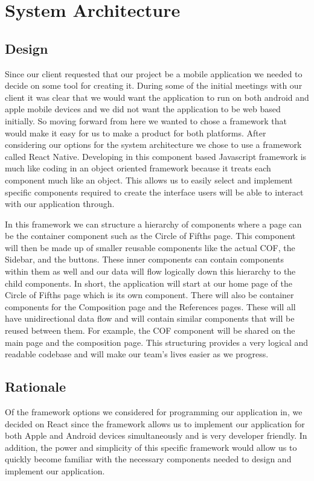 \documentclass[onecolumn, draftclsnofoot,10pt, compsoc]{IEEEtran}
\begin{document}
\section{System Architecture}
\subsection{Design}
Since our client requested that our project be a mobile application we needed to decide on some tool for creating it.
During some of the initial meetings with our client it was clear that we would want the application to run on both android and apple mobile devices and we did not want the application to be web based initially.
So moving forward from here we wanted to chose a framework that would make it easy for us to make a product for both platforms.
After considering our options for the system architecture we chose to use a framework called React Native.
Developing in this component based Javascript framework is much like coding in an object oriented framework because it treats each component much like an object.
This allows us to easily select and implement specific components required to create the interface users will be able to interact with our application through. 

In this framework we can structure a hierarchy of components where a page can be the container component such as the Circle of Fifths page.
This component will then be made up of smaller reusable components like the actual COF, the Sidebar, and the buttons.
These inner components can contain components within them as well and our data will flow logically down this hierarchy to the child components.
In short, the application will start at our home page of the Circle of Fifths page which is its own component.
There will also be container components for the Composition page and the References pages.
These will all have unidirectional data flow and will contain similar components that will be reused between them.
For example, the COF component will be shared on the main page and the composition page.
This structuring provides a very logical and readable codebase and will make our team’s lives easier as we progress.

\subsection{Rationale}
Of the framework options we considered for programming our application in, we decided on React since the framework allows us to implement our application for both Apple and Android devices simultaneously and is very developer friendly.
In addition, the power and simplicity of this specific framework would allow us to quickly become familiar with the necessary components needed to design and implement our application.
\end{document}

